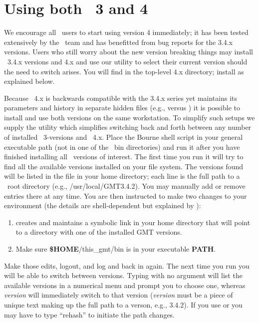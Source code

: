 %
%

\chapter{Using both \gmt\ 3 and 4}
\label{app:P}
\thispagestyle{headings}

We encourage all \GMT\ users to start using version 4 immediately; it has been tested extensively by
the \GMT\ team and has benefitted from bug reports for the 3.4.x versions.  Users who still worry about the
new version breaking things may install \GMT\ 3.4.x versions and 4.x and use our utility 
to select their current version should the need to switch arises.  You will find 
in the top-level \GMT 4.x directory; install as explained below.

Because \GMT\ 4.x is backwards compatible with the 3.4.x series yet maintains its parameters
and history in separate hidden files (e.g.,  versus )
it is possible to install and use both versions on the same workstation.  To simplify such
setups we supply the utility  which simplifies switching back and forth
between any number of installed \GMT\ 3-versions and \GMT\ 4.x.  Place the  Bourne
shell script in your
general executable path (not in one of the \GMT\ bin directories) and run it after you have
finished installing all \GMT\ versions of interest.  The first time you run 
it will try to find all the available versions installed on your file system.  The versions
found will be listed in the file  in your home directory; each line
is the full path to a \GMT\ root directory (e.g., /usr/local/GMT3.4.2).  You may
manually add or remove entries there at any time.  You are then instructed to make two
changes to your environment (the details are shell-dependent but explained by ):
\begin{enumerate}
\item {} creates and maintains a symbolic link  in your home
directory that will point to a directory with one of the installed GMT versions.
\item Make sure {\bf \$HOME}/this\_gmt/bin is in your executable {\bf PATH}.
\end{enumerate}
Make those edits, logout, and log and back in again.  The next time you run 
you will be able to switch between versions.  Typing  with no argument will list the
available versions in a numerical menu and prompt you to choose one, whereas  {\it version}
will immediately switch to that version ({\it version} must be a piece of unique text making
up the full path to a verson, e.g., 3.4.2).  If you use  or  you may have to type
``rehash'' to initiate the path changes.
